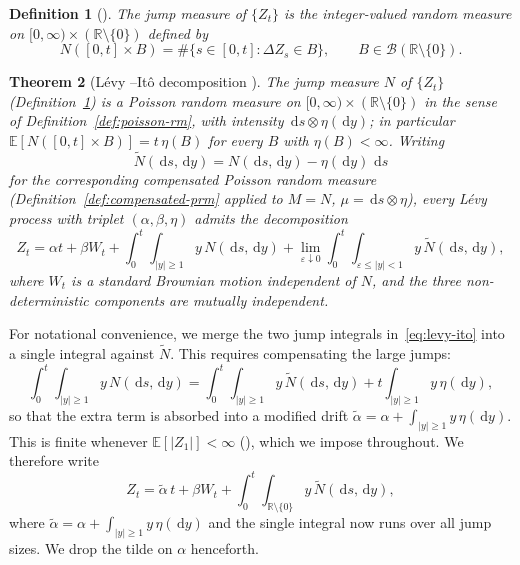 \documentclass{article}
\newtheorem{thm}{Theorem}[section]
\newtheorem{defn}[thm]{Definition}
\newcommand{\levy}{{L\'evy }}
\def\R{\mathbb{R}}
\def\E{\mathbb{E}}
\def\d{\,\mathrm{d}}
\theoremstyle{definition}
\begin{document}
\begin{defn}[{\cite[Section~2.6.1]{ContTankov2004}}]
\label{def:jump-measure}
The \emph{jump measure} of $\{Z_t\}$ is the integer-valued random measure on $[0,\infty) \times (\R \setminus \{0\})$ defined by
\[
  N([0,t] \times B) = \#\{s \in [0,t] : \Delta Z_s \in B\},
  \qquad B \in \mathcal{B}(\R \setminus \{0\}).
\]
\end{defn}

\begin{thm}[\levy--It\^{o} decomposition {\cite[Proposition~3.7]{ContTankov2004}}]
\label{thm:levy-ito}
The jump measure $N$ of $\{Z_t\}$ (Definition~\ref{def:jump-measure}) is a Poisson random measure on $[0,\infty) \times (\R \setminus \{0\})$ in the sense of Definition~\ref{def:poisson-rm}, with intensity $\d s \otimes \eta(\d y)$; in particular $\E[N([0,t] \times B)] = t\,\eta(B)$ for every $B$ with $\eta(B) < \infty$. Writing
\[
  \widetilde{N}(\d s, \d y) = N(\d s, \d y) - \eta(\d y)\,\d s
\]
for the corresponding compensated Poisson random measure (Definition~\ref{def:compensated-prm} applied to $M = N$, $\mu = \d s \otimes \eta$), every \levy process with triplet $(\alpha, \beta, \eta)$ admits the decomposition
\begin{equation}\label{eq:levy-ito}
  Z_t = \alpha t + \beta W_t
    + \int_0^t\!\int_{|y|\geq 1} y\,N(\d s, \d y)
    + \lim_{\varepsilon \downarrow 0}
      \int_0^t\!\int_{\varepsilon \leq |y| < 1} y\,\widetilde{N}(\d s, \d y),
\end{equation}
where $W_t$ is a standard Brownian motion independent of $N$, and the three non-deterministic components are mutually independent.
\end{thm}

For notational convenience, we merge the two jump integrals
in~\eqref{eq:levy-ito} into a single integral against $\tilde{N}$. This requires
compensating the large jumps:
\[
  \int_0^t\!\int_{|y|\geq 1} y\,N(\d s, \d y)
  = \int_0^t\!\int_{|y|\geq 1} y\,\tilde{N}(\d s, \d y)
    + t\int_{|y|\geq 1} y\,\eta(\d y),
\]
so that the extra term is absorbed into a modified drift
$\widetilde{\alpha} = \alpha + \int_{|y|\geq 1} y\,\eta(\d y)$.
This is finite whenever $\E[|Z_1|] < \infty$
(\cite[Proposition~3.13]{ContTankov2004}), which we impose throughout. We therefore
write
\begin{equation}\label{eq:levy-ito-short}
  Z_t = \widetilde{\alpha}\, t + \beta W_t
    + \int_0^t\!\int_{\R\setminus\{0\}} y\,\tilde{N}(\d s, \d y),
\end{equation}
where $\widetilde{\alpha} = \alpha + \int_{|y|\geq 1} y\,\eta(\d y)$ and the
single integral now runs over all jump sizes. We drop the tilde on $\alpha$
henceforth.
\end{document}
